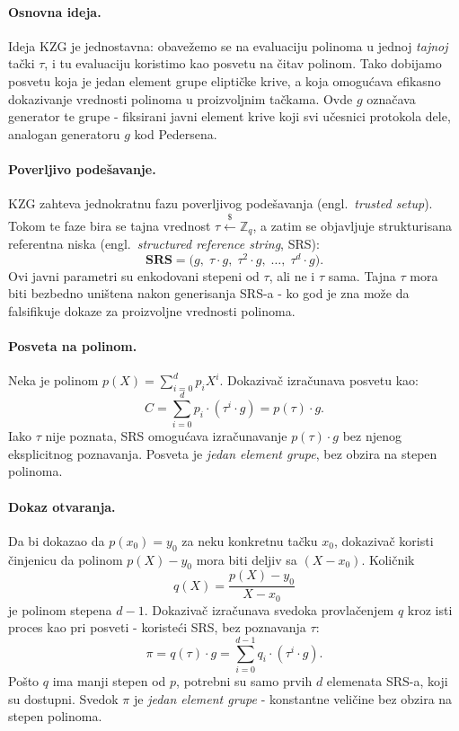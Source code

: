 \paragraph{Osnovna ideja.}
Ideja KZG je jednostavna: obavežemo se na evaluaciju polinoma u jednoj \emph{tajnoj}
tački $\tau$, i tu evaluaciju koristimo kao posvetu na čitav polinom. Tako dobijamo
posvetu koja je jedan element grupe eliptičke krive, a koja omogućava efikasno dokazivanje
vrednosti polinoma u proizvoljnim tačkama. Ovde $g$ označava generator te grupe - fiksirani
javni element krive koji svi učesnici protokola dele, analogan generatoru $g$ kod Pedersena.

\paragraph{Poverljivo podešavanje.}
KZG zahteva jednokratnu fazu poverljivog podešavanja (engl.\ \textit{trusted setup}).
Tokom te faze bira se tajna vrednost $\tau \xleftarrow{\$} \mathbb{Z}_q$, a zatim se
objavljuje strukturisana referentna niska (engl.\ \textit{structured reference string}, SRS):
\[
  \mathbf{SRS} = \bigl(g,\; \tau \cdot g,\; \tau^2 \cdot g,\; \ldots,\; \tau^d \cdot g\bigr).
\]
Ovi javni parametri su enkodovani stepeni od $\tau$, ali ne i $\tau$ sama.
Tajna $\tau$ mora biti bezbedno uništena nakon generisanja SRS-a - ko god je zna
može da falsifikuje dokaze za proizvoljne vrednosti polinoma.

\paragraph{Posveta na polinom.}
Neka je polinom $p(X) = \sum_{i=0}^{d} p_i X^i$. Dokazivač izračunava posvetu kao:
\[
  C = \sum_{i=0}^{d} p_i \cdot (\tau^i \cdot g) = p(\tau) \cdot g.
\]
Iako $\tau$ nije poznata, SRS omogućava izračunavanje $p(\tau) \cdot g$ bez njenog
eksplicitnog poznavanja. Posveta je \emph{jedan element grupe}, bez obzira na stepen polinoma.

\paragraph{Dokaz otvaranja.}
Da bi dokazao da $p(x_0) = y_0$ za neku konkretnu tačku $x_0$, dokazivač koristi činjenicu
da polinom $p(X) - y_0$ mora biti deljiv sa $(X - x_0)$. Količnik
\[
  q(X) = \frac{p(X) - y_0}{X - x_0}
\]
je polinom stepena $d-1$. Dokazivač izračunava svedoka provlačenjem $q$ kroz isti proces
kao pri posveti - koristeći SRS, bez poznavanja $\tau$:
\[
  \pi = q(\tau) \cdot g = \sum_{i=0}^{d-1} q_i \cdot (\tau^i \cdot g).
\]
Pošto $q$ ima manji stepen od $p$, potrebni su samo prvih $d$ elemenata SRS-a, koji su
dostupni. Svedok $\pi$ je \emph{jedan element grupe} - konstantne veličine bez obzira
na stepen polinoma.

